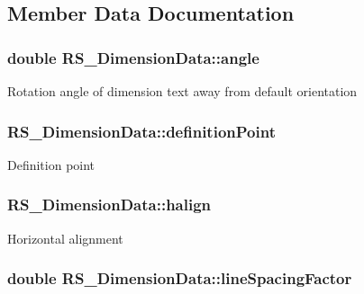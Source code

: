 \subsection{Member Data Documentation}
\hypertarget{classRS__DimensionData_a7ef296ececae34dcbb9285010327d55f}{
\subsubsection[{angle}]{\setlength{\rightskip}{0pt plus 5cm}double R\-S\-\_\-\-Dimension\-Data\-::angle}}\label{classRS__DimensionData_a7ef296ececae34dcbb9285010327d55f}
Rotation angle of dimension text away from default orientation \hypertarget{classRS__DimensionData_aaa0d4876e7fe6d387b614ce5061fd41b}{
\subsubsection[{definition\-Point}]{ R\-S\-\_\-\-Dimension\-Data\-::definition\-Point}}\label{classRS__DimensionData_aaa0d4876e7fe6d387b614ce5061fd41b}
Definition point \hypertarget{classRS__DimensionData_a4dc9c4badabffec10a80cc6e145bbc4b}{
\subsubsection[{halign}]{ R\-S\-\_\-\-Dimension\-Data\-::halign}}\label{classRS__DimensionData_a4dc9c4badabffec10a80cc6e145bbc4b}
Horizontal alignment \hypertarget{classRS__DimensionData_a68af239c4f73570483766d6b8f81ba53}{
\subsubsection[{line\-Spacing\-Factor}]{\setlength{\rightskip}{0pt plus 5cm}double R\-S\-\_\-\-Dimension\-Data\-::line\-Spacing\-Factor}}\label{classRS__DimensionData_a68af239c4f73570483766d6b8f81ba53}

